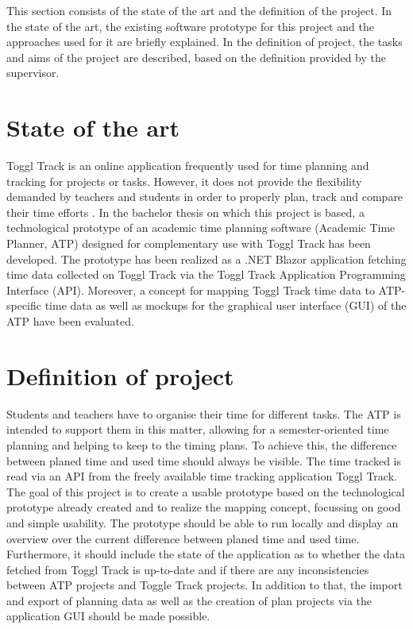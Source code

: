 
This section consists of the state of the art and the definition of the project. In the state of the art, the existing software prototype for this project and the approaches used for it are briefly explained. In the definition of project, the tasks and aims of the project are described, based on the definition provided by the supervisor.

\section{State of the art}
Toggl Track \cite{toggl_track_url} is an online application frequently used for time planning and tracking for projects or tasks. However, it does not provide the flexibility demanded by teachers and students in order to properly plan, track and compare their time efforts \cite{bachelorarbeit_Egger_Verstappen_page2}.
In the bachelor thesis on which this project is based, a technological prototype of an academic time planning software (Academic Time Planner, ATP) designed for complementary use with Toggl Track has been developed. The prototype has been realized as a .NET Blazor application fetching time data collected on Toggl Track via the Toggl Track Application Programming Interface (API). Moreover, a concept for mapping Toggl Track time data to ATP-specific time data as well as mockups for the graphical user interface (GUI) of the ATP have been evaluated.

\section{Definition of project}
Students and teachers have to organise their time for different tasks. The ATP is intended to support them in this matter, allowing for a semester-oriented time planning and helping to keep to the timing plans. To achieve this, the difference between planed time and used time should always be visible.
The time tracked is read via an API from the freely available time tracking application Toggl Track.
The goal of this project is to create a usable prototype based on the technological prototype already created and to realize the mapping concept, focussing on good and simple usability.
The prototype should be able to run locally and display an overview over the current difference between planed time and used time. Furthermore, it should include the state of the application as to whether the data fetched from Toggl Track is up-to-date and if there are any inconsistencies between ATP projects and Toggle Track projects. In addition to that, the import and export of planning data as well as the creation of plan projects via the application GUI should be made possible.
 


